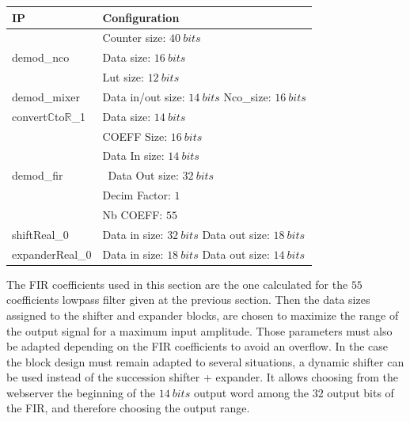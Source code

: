 \documentclass[12pt,oneside]{article}
\begin{document}
\begin{center}
	\begin{tabular}{|>{\centering\arraybackslash}m{.3\linewidth} | >{\centering\arraybackslash}m{.3\linewidth} |}
		\hline
		IP & Configuration \\
		\hline
		& Counter size: $40~bits$\\ demod\_nco &Data size: $16~bits$\\ &Lut size: $12~bits$ \\
		\hline
		demod\_mixer&Data in/out size: $14~bits$ \newline Nco\_size: $16~bits$ \\

		\hline
		convert$\mathbb{C}$to$\mathbb{R}$\_1&Data size: $14~bits$\\
		\hline
		&COEFF Size: $16~bits$\\&Data In size: $14~bits$\\demod\_fir& Data Out size: $32~bits$\\&Decim Factor: $1$\\&Nb COEFF: $55$\\
		\hline
		shiftReal\_0&Data in size: $32~bits$ \newline Data out size: $18~bits$\\
		\hline
		expanderReal\_0&Data in size: $18~bits$ \newline Data out size: $14~bits$\\
		\hline
	\end{tabular}
\end{center}
\vspace{0.2cm}
The FIR coefficients used in this section are the one calculated for the $55$ coefficients lowpass filter given at the previous section. Then the data sizes assigned to the shifter and expander blocks, are chosen to maximize the range of the output signal for a maximum input amplitude. Those parameters must also be adapted depending on the FIR coefficients to avoid an overflow. In the case the block design must remain adapted to several situations, a dynamic shifter can be used instead of the succession shifter + expander. It allows choosing from the webserver the beginning of the $14~bits$ output word among the $32$ output bits of the FIR, and therefore choosing the output range. 

\vspace{0.2cm}
\end{document}

